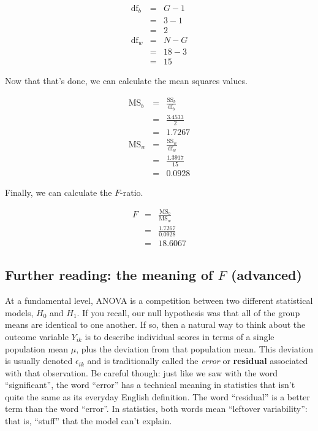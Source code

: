 \documentclass[
  11pt,
  a4paper,
  twoside,symmetric,openright]{book}
\theoremstyle{break}
\theoremstyle{break}
\begin{document}
\[
\begin{array}{lcl}
\mbox{df}_b &=& G-1
    \\
    &=& 3-1
    \\
    &=& 2 \\
\mbox{df}_w &=& N-G
    \\
    &=& 18-3
    \\
    &=& 15
\end{array}
\]

Now that that's done, we can calculate the mean squares values.

\[
\begin{array}{lcl}
\mbox{MS}_b &=& \displaystyle\frac{\mbox{SS}_b }{ \mbox{df}_b} 
    \\
    &=& \displaystyle\frac{3.4533}{2}
    \\
    &=& 1.7267 \\
\mbox{MS}_w &=& \displaystyle\frac{\mbox{SS}_w }{ \mbox{df}_w}
    \\
    &=& \displaystyle\frac{1.3917}{15}
    \\
    &=& 0.0928
\end{array}
\]

Finally, we can calculate the \(F\)-ratio.

\[
\begin{array}{lcl}
F &=& \frac{\mbox{MS}_b }{ \mbox{MS}_w } 
    \\
    &=& \frac{1.7267}{0.0928} 
    \\
    &=& 18.6067
\end{array}
\]

\subsection{\texorpdfstring{Further reading: the meaning of \(F\) (advanced)}{Further reading: the meaning of F (advanced)}}\label{anovamodel}

At a fundamental level, ANOVA is a competition between two different statistical models, \(H_0\) and \(H_1\). If you recall, our null hypothesis was that all of the group means are identical to one another. If so, then a natural way to think about the outcome variable \(Y_{ik}\) is to describe individual scores in terms of a single population mean \(\mu\), plus the deviation from that population mean. This deviation is usually denoted \(\epsilon_{ik}\) and is traditionally called the \emph{error} or \textbf{residual} associated with that observation. Be careful though: just like we saw with the word ``significant'', the word ``error'' has a technical meaning in statistics that isn't quite the same as its everyday English definition. The word ``residual'' is a better term than the word ``error''. In statistics, both words mean ``leftover variability'': that is, ``stuff'' that the model can't explain.
\end{document}
